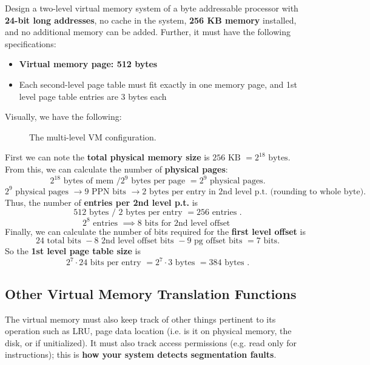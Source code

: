 \begin{problem}
  Design a two-level virtual memory system of a byte addressable processor with \textbf{24-bit long addresses}, no cache in the system, \textbf{256 KB memory} installed, and no additional memory can be added. Further, it must have the following specifications:
  \begin{itemize}
    \item \textbf{Virtual memory page: 512 bytes}
    \item Each second-level page table must fit exactly in one memory page, and 1st level page table entries are 3 bytes each
  \end{itemize}
  Visually, we have the following:
  \begin{figure}[H]
    \centering
    \caption{The multi-level VM configuration.}
    \label{fig:multivmprb}
  \end{figure}
\end{problem}
\begin{answer}
  First we can note the \textbf{total physical memory size} is \(256 \text{ KB } = 2^{18} \text{ bytes}\). From this, we can calculate the number of \textbf{physical pages}:
  \[
    2^{18} \text{ bytes of mem } / 2^9 \text{ bytes per page } = 2^9 \text{ physical pages}.
  \]
  \[
    2^9 \text{ physical pages } \to 9 \text{ PPN bits } \to 2 \text{ bytes per entry in 2nd level p.t. (rounding to whole byte)}.
  \]
  Thus, the number of \textbf{entries per 2nd level p.t.} is
  \[
    512 \text{ bytes } / \text{ 2 bytes per entry } = 256 \text{ entries }.
  \]
  \[
    2^8 \text{ entries } \implies 8 \text{ bits for 2nd level offset }
  \]
  Finally, we can calculate the number of bits required for the \textbf{first level offset} is
  \[
    24 \text{ total bits } - 8 \text{ 2nd level offset bits } - 9 \text{ pg offset bits } = 7 \text{ bits}.
  \]
  So the \textbf{1st level page table size} is
  \[
    2^7 \cdot 24 \text{ bits per entry } = 2^7 \cdot 3 \text{ bytes } = 384 \text{ bytes }. 
  \]
\end{answer}

\subsection{Other Virtual Memory Translation Functions}
The virtual memory must also keep track of other things pertinent to its operation such as LRU, page data location (i.e. is it on physical memory, the disk, or if unitialized). It must also track access permissions (e.g. read only for instructions); this is \textbf{how your system detects segmentation faults}.
